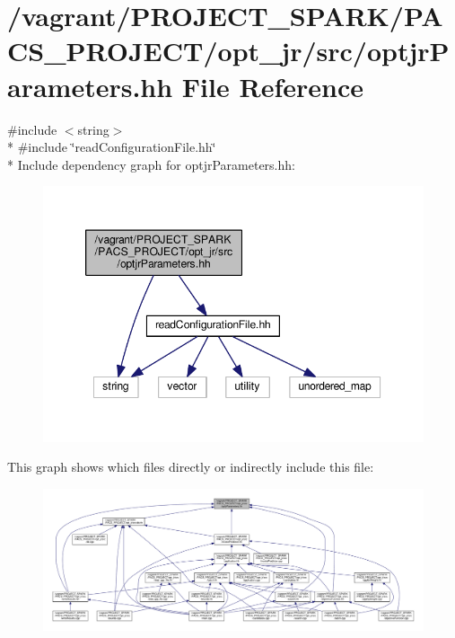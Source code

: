 \hypertarget{optjrParameters_8hh}{\section{/vagrant/\-P\-R\-O\-J\-E\-C\-T\-\_\-\-S\-P\-A\-R\-K/\-P\-A\-C\-S\-\_\-\-P\-R\-O\-J\-E\-C\-T/opt\-\_\-jr/src/optjr\-Parameters.hh File Reference}
\label{optjrParameters_8hh}
}
{\ttfamily \#include $<$string$>$}\\*
{\ttfamily \#include \char`\"{}read\-Configuration\-File.\-hh\char`\"{}}\\*
Include dependency graph for optjr\-Parameters.\-hh\-:\nopagebreak
\begin{figure}[H]
\begin{center}
\leavevmode
\includegraphics[width=349pt]{optjrParameters_8hh__incl}
\end{center}
\end{figure}
This graph shows which files directly or indirectly include this file\-:
\nopagebreak
\begin{figure}[H]
\begin{center}
\leavevmode
\includegraphics[width=350pt]{optjrParameters_8hh__dep__incl}
\end{center}
\end{figure}
